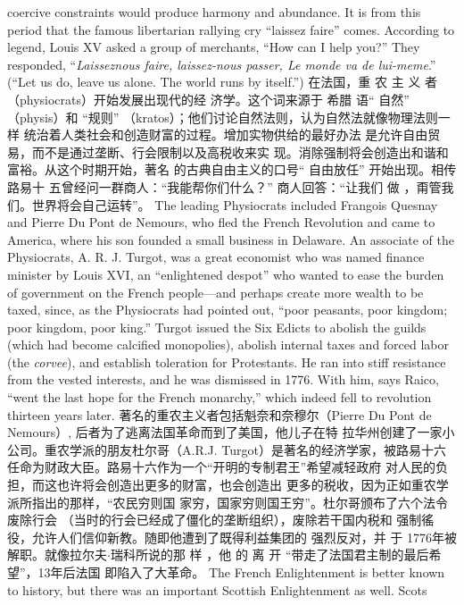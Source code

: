 \begin{paracol}{2}
coercive constraints would produce harmony and abundance. It
is from this period that the famous libertarian rallying cry ``laissez faire'' comes. According to legend, Louis XV asked a group of merchants, ``How can I help you?'' They responded, ``\textit{Laisseznous faire, laissez-nous passer, Le monde va de lui-meme}.'' (``Let us do,
leave us alone. The world runs by itself.'')
\switchcolumn
在法国，重 农 主 义 者 （physiocrats）开始发展出现代的经
济学。这个词来源于 希腊 语“ 自然”  （physis）和 “规则”
（kratos）；他们讨论自然法则，认为自然法就像物理法则一样
统治着人类社会和创造财富的过程。增加实物供给的最好办法
是允许自由贸易，而不是通过垄断、行会限制以及高税收来实
现。消除强制将会创造出和谐和富裕。从这个时期开始，著名
的古典自由主义的口号“ 自由放任” 开始出现。相传路易十
五曾经问一群商人：“我能帮你们什么？” 商人回答：“让我们
做 ，甭管我们。世界将会自己运转”。
\switchcolumn*
The leading Physiocrats included Frangois Quesnay and
Pierre Du Pont de Nemours, who fled the French Revolution
and came to America, where his son founded a small business in
Delaware. An associate of the Physiocrats, A. R. J. Turgot, was
a great economist who was named finance minister by Louis
XVI, an ``enlightened despot'' who wanted to ease the burden
of government on the French people---and perhaps create more
wealth to be taxed, since, as the Physiocrats had pointed out,
``poor peasants, poor kingdom; poor kingdom, poor king.'' Turgot issued the Six Edicts to abolish the guilds (which had become calcified monopolies), abolish internal taxes and forced
labor (the \textit{corvee}), and establish toleration for Protestants. He
ran into stiff resistance from the vested interests, and he was
dismissed in 1776. With him, says Raico, ``went the last hope
for the French monarchy,'' which indeed fell to revolution thirteen years later.
\switchcolumn
著名的重农主义者包括魁奈和奈穆尔（Pierre Du Pont de
Nemours）, 后者为了逃离法国革命而到了美国，他儿子在特
拉华州创建了一家小公司。重农学派的朋友杜尔哥（A.R.J. Turgot）是著名的经济学家，被路易十六任命为财政大臣。路易十六作为一个“开明的专制君王”希望减轻政府
对人民的负担，而这也许将会创造出更多的财富，也会创造出
更多的税收，因为正如重农学派所指出的那样，“农民穷则国
家穷，国家穷则国王穷”。杜尔哥颁布了六个法令废除行会
（当时的行会已经成了僵化的垄断组织），废除若干国内税和
强制徭役，允许人们信仰新教。随即他遭到了既得利益集团的
强烈反对，并 于 1776年被解职。就像拉尔夫$\cdot$瑞科所说的那
样 ，他 的 离 开 “带走了法国君主制的最后希望”，13年后法国
即陷入了大革命。
\switchcolumn*
The French Enlightenment is better known to history, but
there was an important Scottish Enlightenment as well. Scots

\end{paracol}

